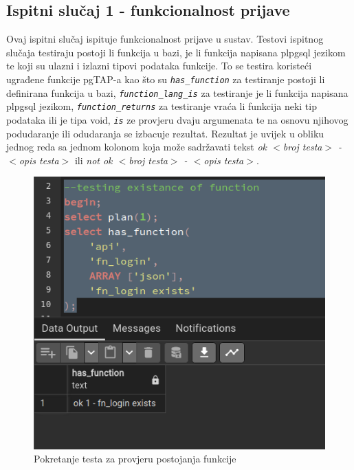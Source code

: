				\subsection{Ispitni slučaj 1 - funkcionalnost prijave}
				Ovaj ispitni slučaj ispituje funkcionalnost prijave u sustav. Testovi ispitnog slučaja testiraju postoji li funkcija u bazi, je li funkcija napisana plpgsql jezikom te koji su ulazni i izlazni tipovi podataka funkcije. To se testira koristeći ugrađene funkcije pgTAP-a kao što su \textit{\texttt{has\_function}} za testiranje postoji li definirana funkcija u bazi, \textit{\texttt{function\_lang\_is}} za testiranje je li funkcija napisana plpgsql jezikom, \textit{\texttt{function\_returns}} za testiranje vraća li funkcija neki tip podataka ili je tipa void, \textit{\texttt{is\(\)}} ze provjeru dvaju argumenata te na osnovu njihovog podudaranje ili odudaranja se izbacuje rezultat. Rezultat je uvijek u obliku jednog reda sa jednom kolonom koja može sadržavati tekst \textit{ok $<$broj testa$>$ - $<$opis testa$>$} ili \textit{not ok $<$broj testa$>$ - $<$opis testa$>$}.
				\begin{figure}[H]
					\centering
					\includegraphics[width=\textwidth]{slike/unit_tests/ut_1/has_func.png}
					\caption{Pokretanje testa za provjeru postojanja funkcije}
					\label{fig: IS1-has_function}
				\end{figure}
